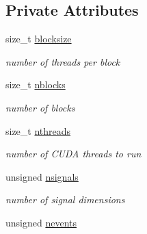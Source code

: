 \subsection*{Private Attributes}
\begin{DoxyCompactItemize}
\item 
\hypertarget{classNLL_a93fb66712a12d038e58d4779fb81cd18}{
size\_\-t \hyperlink{classNLL_a93fb66712a12d038e58d4779fb81cd18}{blocksize}}
\label{classNLL_a93fb66712a12d038e58d4779fb81cd18}

\begin{DoxyCompactList}\small\item\em number of threads per block \item\end{DoxyCompactList}\item 
\hypertarget{classNLL_a86fc6895cb00663d7438312efb3e9072}{
size\_\-t \hyperlink{classNLL_a86fc6895cb00663d7438312efb3e9072}{nblocks}}
\label{classNLL_a86fc6895cb00663d7438312efb3e9072}

\begin{DoxyCompactList}\small\item\em number of blocks \item\end{DoxyCompactList}\item 
\hypertarget{classNLL_afcfe286859adfa4943b0d2c044f2845c}{
size\_\-t \hyperlink{classNLL_afcfe286859adfa4943b0d2c044f2845c}{nthreads}}
\label{classNLL_afcfe286859adfa4943b0d2c044f2845c}

\begin{DoxyCompactList}\small\item\em number of CUDA threads to run \item\end{DoxyCompactList}\item 
\hypertarget{classNLL_a811859dca6a5cec58be3077686051f3a}{
unsigned \hyperlink{classNLL_a811859dca6a5cec58be3077686051f3a}{nsignals}}
\label{classNLL_a811859dca6a5cec58be3077686051f3a}

\begin{DoxyCompactList}\small\item\em number of signal dimensions \item\end{DoxyCompactList}\item 
\hypertarget{classNLL_ae5765088b57d57ed189d2a8ca5f84b19}{
unsigned \hyperlink{classNLL_ae5765088b57d57ed189d2a8ca5f84b19}{nevents}}
\label{classNLL_ae5765088b57d57ed189d2a8ca5f84b19}


\end{DoxyCompactItemize}
